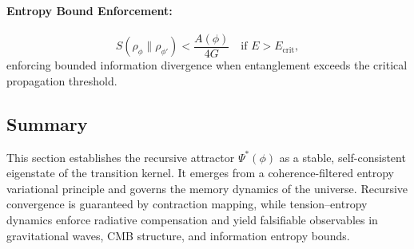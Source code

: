\paragraph{Entropy Bound Enforcement:}
\[
S(\rho_\phi \| \rho_{\phi'}) < \frac{A(\phi)}{4G} \quad \text{if } E > E_{\text{crit}},
\]
enforcing bounded information divergence when entanglement exceeds the critical propagation threshold.

\subsection{Summary}

This section establishes the recursive attractor \( \Psi^*(\phi) \) as a stable, self-consistent eigenstate of the transition kernel. It emerges from a coherence-filtered entropy variational principle and governs the memory dynamics of the universe. Recursive convergence is guaranteed by contraction mapping, while tension–entropy dynamics enforce radiative compensation and yield falsifiable observables in gravitational waves, CMB structure, and information entropy bounds.

